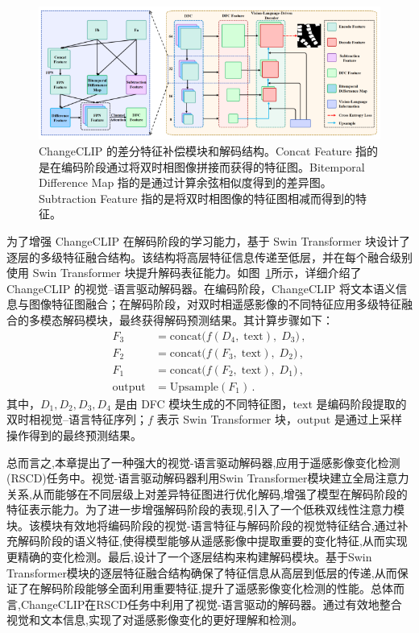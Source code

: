 \begin{figure}[!htbp]
  \centering
  \includegraphics[width=\textwidth]{paper_figures/基于AI基础模型微调的变化检测模型研究/ChangeCLIP/changeclip4.png}
  \caption{ChangeCLIP 的差分特征补偿模块和解码结构。Concat Feature 指的是在编码阶段通过将双时相图像拼接而获得的特征图。Bitemporal Difference Map 指的是通过计算余弦相似度得到的差异图。Subtraction Feature 指的是将双时相图像的特征图相减而得到的特征。}
  \label{fig:changeclip4}
\end{figure}

为了增强 ChangeCLIP 在解码阶段的学习能力，基于 Swin Transformer 块设计了逐层的多级特征融合结构。该结构将高层特征信息传递至低层，并在每个融合级别使用 Swin Transformer 块提升解码表征能力。如图~\ref{fig:changeclip4}所示，详细介绍了 ChangeCLIP 的视觉–语言驱动解码器。在编码阶段，ChangeCLIP 将文本语义信息与图像特征图融合；在解码阶段，对双时相遥感影像的不同特征应用多级特征融合的多模态解码模块，最终获得解码预测结果。其计算步骤如下：
\begin{align}
F_3 &= \mathrm{concat}\bigl(f(D_4,\;\text{text}),\;D_3\bigr)\,, \label{eq:changeclip-23}\\
F_2 &= \mathrm{concat}\bigl(f(F_3,\;\text{text}),\;D_2\bigr)\,, \label{eq:changeclip-24}\\
F_1 &= \mathrm{concat}\bigl(f(F_2,\;\text{text}),\;D_1\bigr)\,, \label{eq:changeclip-25}\\
\mathrm{output} &= \mathrm{Upsample}(F_1)\,. \label{eq:changeclip-26}
\end{align}
其中，$D_1, D_2, D_3, D_4$ 是由 DFC 模块生成的不同特征图，$\text{text}$ 是编码阶段提取的双时相视觉–语言特征序列；$f$ 表示 Swin Transformer 块，$\mathrm{output}$ 是通过上采样操作得到的最终预测结果。

总而言之,本章提出了一种强大的视觉-语言驱动解码器,应用于遥感影像变化检测(RSCD)任务中。视觉-语言驱动解码器利用Swin Transformer模块建立全局注意力关系,从而能够在不同层级上对差异特征图进行优化解码,增强了模型在解码阶段的特征表示能力。为了进一步增强解码阶段的表现,引入了一个低秩双线性注意力模块。该模块有效地将编码阶段的视觉-语言特征与解码阶段的视觉特征结合,通过补充解码阶段的语义特征,使得模型能够从遥感影像中提取重要的变化特征,从而实现更精确的变化检测。最后,设计了一个逐层结构来构建解码模块。基于Swin Transformer模块的逐层特征融合结构确保了特征信息从高层到低层的传递,从而保证了在解码阶段能够全面利用重要特征,提升了遥感影像变化检测的性能。总体而言,ChangeCLIP在RSCD任务中利用了视觉-语言驱动的解码器。通过有效地整合视觉和文本信息,实现了对遥感影像变化的更好理解和检测。

